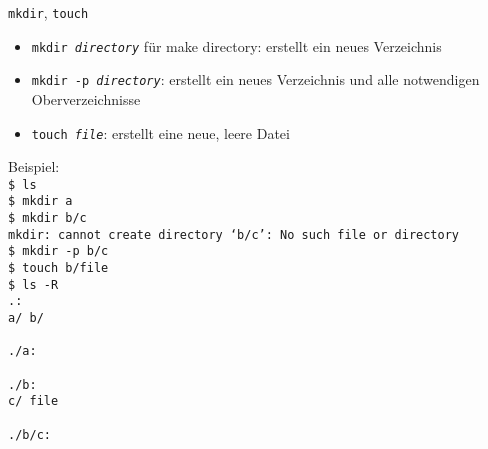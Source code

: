     \begin{frame}{\texttt{mkdir}, \texttt{touch}}
      \begin{itemize}
        \item \texttt{mkdir \textit{directory}} für make directory: erstellt ein neues Verzeichnis
        \item \texttt{mkdir -p \textit{directory}}: erstellt ein neues Verzeichnis und alle notwendigen Oberverzeichnisse
        \item \texttt{touch \textit{file}}: erstellt eine neue, leere Datei
      \end{itemize}
    \end{frame}

    \begin{frame}
      Beispiel:\\
      \texttt{\$ ls\\
              \$ mkdir a\\
              \$ mkdir b/c\\
              mkdir: cannot create directory ‘b/c’: No such file or directory\\
              \$ mkdir -p b/c\\
              \$ touch b/file\\
              \$ ls -R\\
              .:\\
              a/  b/\\
              ~\\
              ./a:\\
              ~\\                  
              ./b:\\
              c/ file\\
              ~\\
              ./b/c:}
    \end{frame}

